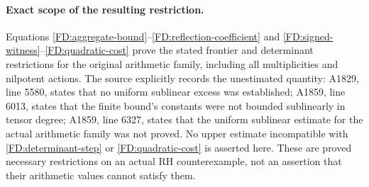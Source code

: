 \paragraph{Exact scope of the resulting restriction.}
Equations \eqref{FD:aggregate-bound}--\eqref{FD:reflection-coefficient}
and \eqref{FD:signed-witness}--\eqref{FD:quadratic-cost} prove the stated
frontier and determinant restrictions for the original arithmetic
family, including all multiplicities and nilpotent actions.  The source
explicitly records the unestimated quantity: A1829, line 5580, states
that no uniform sublinear excess was established; A1859, line 6013,
states that the finite bound's constants were not bounded sublinearly in
tensor degree; A1859, line 6327, states that the uniform sublinear
estimate for the actual arithmetic family was not proved.  No upper
estimate incompatible with \eqref{FD:determinant-step} or
\eqref{FD:quadratic-cost} is asserted here.  These are proved necessary
restrictions on an actual RH counterexample, not an assertion that their
arithmetic values cannot satisfy them.
